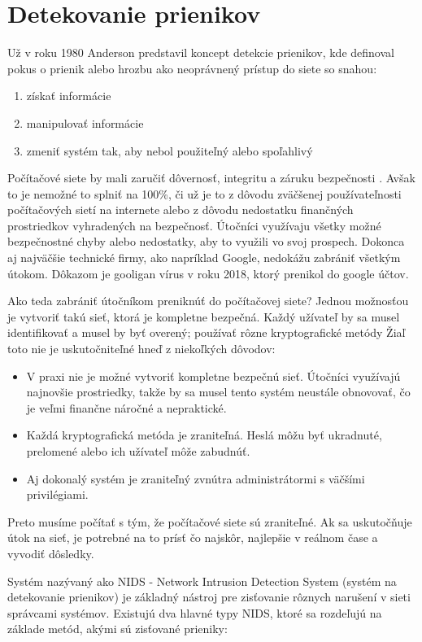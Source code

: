 \section{Detekovanie prienikov}
    Už v roku 1980 Anderson \cite{anderson} predstavil koncept detekcie prienikov, kde definoval pokus o prienik alebo hrozbu ako neoprávnený prístup do siete so snahou:
\begin{enumerate}
   \item získať informácie
    \item manipulovať informácie
    \item zmeniť systém tak, aby nebol použiteľný alebo spoľahlivý
\end{enumerate}


Počítačové siete by mali zaručiť dôvernosť, integritu a záruku bezpečnosti \cite{sundaram}. Avšak to je nemožné to splniť na 100\%, či už je to z dôvodu zväčšenej používateľnosti počítačových sietí na internete alebo z dôvodu nedostatku finančných prostriedkov vyhradených na bezpečnosť. Útočníci využívaju všetky možné bezpečnostné chyby alebo nedostatky, aby to využili vo svoj prospech. Dokonca aj najväčšie technické firmy, ako napríklad Google, nedokážu zabrániť všetkým útokom. Dôkazom je gooligan vírus v roku 2018, ktorý prenikol do google účtov.\par
Ako teda zabrániť útočníkom preniknúť do počítačovej siete? Jednou možnosťou je vytvoriť takú sieť, ktorá je kompletne bezpečná. Každý užívateľ by sa musel identifikovať a musel by  byť overený; používať rôzne kryptografické metódy  Žiaľ toto nie je uskutočniteľné hneď z niekoľkých dôvodov: 
\begin{itemize}
    \item V praxi nie je možné vytvoriť kompletne bezpečnú sieť. Útočníci využívajú najnovšie prostriedky, takže by sa musel tento systém neustále obnovovať, čo je veľmi finančne náročné a nepraktické.
    \item Každá kryptografická metóda je zraniteľná. Heslá môžu byť ukradnuté, prelomené alebo ich užívateľ môže zabudnúť.
    \item Aj dokonalý systém je zraniteľný zvnútra administrátormi s väčšími privilégiami.
\end{itemize}\cite{sundaram}
Preto musíme počítať s tým, že počítačové siete sú zraniteľné. Ak sa uskutočňuje útok na sieť, je potrebné na to prísť čo najskôr, najlepšie v reálnom čase a vyvodiť dôsledky.\par
Systém nazývaný ako NIDS - Network Intrusion Detection System (systém na detekovanie prienikov)\cite{javaid}   je základný nástroj pre zisťovanie  rôznych narušení v sieti správcami systémov. Existujú dva hlavné typy NIDS, ktoré sa rozdeľujú na základe metód, akými sú zisťované prieniky:
